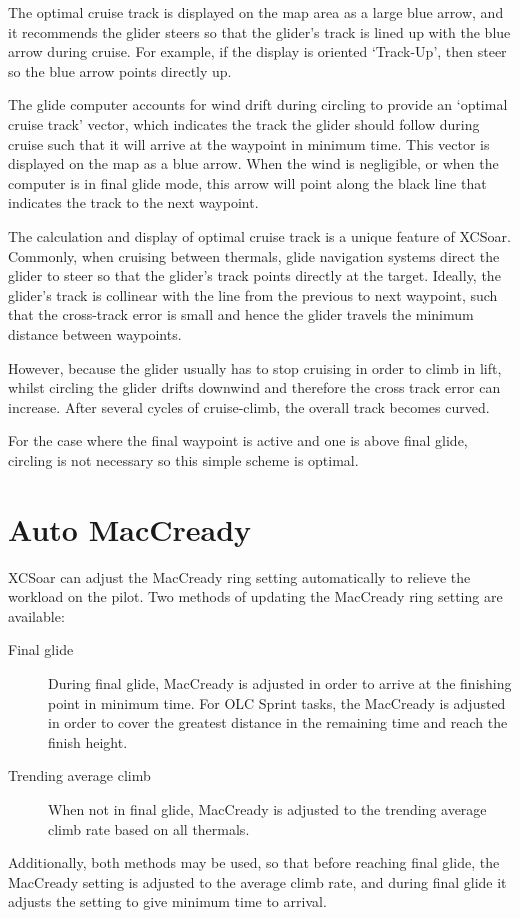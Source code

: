 The optimal cruise track is displayed on the map area as a large blue
arrow, and it recommends the glider steers so that the glider's track
is lined up with the blue arrow during cruise.  For example, if the
display is oriented `Track-Up', then steer so the blue arrow points
directly up.

The glide computer accounts for wind drift during circling to provide
an `optimal cruise track' vector, which indicates the track the glider
should follow during cruise such that it will arrive at the waypoint
in minimum time.  This vector is displayed on the map as a blue arrow.
When the wind is negligible, or when the computer is in final glide
mode, this arrow will point along the black line that indicates the
track to the next waypoint.

The calculation and display of optimal cruise track is a unique
feature of XCSoar.  Commonly, when cruising between thermals, glide
navigation systems direct the glider to steer so that the glider's
track points directly at the target.  Ideally, the glider's track is
collinear with the line from the previous to next waypoint, such that
the cross-track error is small and hence the glider travels the
minimum distance between waypoints.

However, because the glider usually has to stop cruising in order to
climb in lift, whilst circling the glider drifts downwind and
therefore the cross track error can increase.  After several cycles of
cruise-climb, the overall track becomes curved.
%

For the case where the final waypoint is active and one is above final
glide, circling is not necessary so this simple scheme is optimal.


\section{Auto MacCready}\label{sec:auto-maccready}

XCSoar can adjust the MacCready ring setting automatically to relieve the
workload on the pilot.  Two methods of updating the MacCready ring setting
are available:
\begin{description}
\item[Final glide]  During final glide, MacCready is adjusted in order to
 arrive at the finishing point in minimum time.  For OLC Sprint tasks,
 the MacCready is adjusted in order to cover the greatest distance in the remaining
 time and reach the finish height.
\item[Trending average climb] When not in final glide, MacCready is adjusted
to the trending average climb rate based on all thermals.
\end{description}
Additionally, both methods may be used, so that before reaching final glide,
the MacCready setting is adjusted to the average climb rate, and during final
glide it adjusts the setting to give minimum time to arrival.

